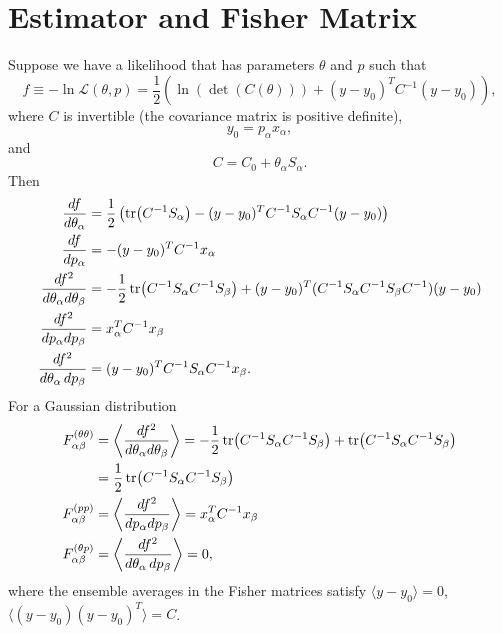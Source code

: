 \documentclass{article}
\begin{document}
\appendix
\section{Estimator and Fisher Matrix}
\label{appendix:sec}
Suppose we have a likelihood that has parameters $\theta$ and $p$ such that
$$f\equiv-\ln{\mathcal{L}(\theta,p)} = \frac{1}{2}\left(\ln{(\det(C(\theta)))} + (y-y_0 )^T C^{-1} (y-y_0)\right),$$
where $C$ is invertible (the covariance matrix is positive definite),
$$y_0 = p_\alpha x_\alpha,$$ and
 $$C=C_0 + \theta_\alpha S_\alpha.$$
Then
\begin{align}
\frac{df}{d\theta_\alpha} &= \frac{1}{2}\left(\tr(C^{-1}S_\alpha)   - (y-y_0)^T  C^{-1} S_{\alpha} C^{-1}  (y-y_0)\right)\\ 
\frac{df}{dp_{\alpha}} &= -(y-y_0)^T C^{-1} x_\alpha\\ 
\frac{df^2}{d\theta_{\alpha} d\theta_\beta} &=- \frac{1}{2}  \tr (C^{-1} S_\alpha C^{-1}  S_\beta) +  (y-y_0)^T (
C^{-1} S_{\alpha} C^{-1} S_\beta C^{-1}
)
(y-y_0) \\ 
\frac{df^2}{dp_{\alpha} dp_\beta} &= x^T_\alpha C^{-1} x_\beta\\ 
\frac{df^2}{d\theta_\alpha\,dp_\beta} &= (y-y_0)^T C^{-1}  S _\alpha C^{-1} x_\beta.
\end{align}
For a Gaussian distribution
\begin{align}
F_{\alpha \beta}^{(\theta \theta)} & = \left \langle  \frac{df^2}{d\theta_{\alpha} d\theta_\beta} \right \rangle =  -\frac{1}{2} \tr (C^{-1} S_\alpha C^{-1}  S_\beta)    + \tr (C^{-1} S_\alpha C^{-1}  S_\beta) \\ 
& = \frac{1}{2} \tr (C^{-1} S_\alpha C^{-1}  S_\beta) \\
F_{\alpha \beta}^{(p p)}  & = \left \langle  \frac{df^2}{dp_{\alpha} dp_\beta} \right \rangle=  x^T_\alpha C^{-1} x_\beta\\ 
F_{\alpha \beta}^{(\theta p)}  & = \left \langle  \frac{df^2}{d\theta_\alpha \,dp_\beta} \right \rangle =0,
\end{align}
where the ensemble averages in the Fisher matrices satisfy  $\langle y-y_0 \rangle = 0$, $\langle (y-y_0) (y-y_0)^T\rangle = C$.
\end{document}
